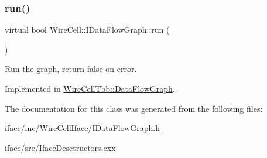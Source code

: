 \mbox{\label{class_wire_cell_1_1_i_data_flow_graph_ab741ef1a0f772cb278dd2f111b54867e}} 
\subsubsection{\texorpdfstring{run()}{run()}}
{\footnotesize\ttfamily virtual bool Wire\+Cell\+::\+I\+Data\+Flow\+Graph\+::run (\begin{DoxyParamCaption}{ }\end{DoxyParamCaption})\hspace{0.3cm}{\ttfamily [pure virtual]}}



Run the graph, return false on error. 



Implemented in \hyperlink{class_wire_cell_tbb_1_1_data_flow_graph_ae8e14d9ad578b85a9e6faf4db69cc31b}{Wire\+Cell\+Tbb\+::\+Data\+Flow\+Graph}.



The documentation for this class was generated from the following files\+:\begin{DoxyCompactItemize}
\item 
iface/inc/\+Wire\+Cell\+Iface/\hyperlink{_i_data_flow_graph_8h}{I\+Data\+Flow\+Graph.\+h}\item 
iface/src/\hyperlink{_iface_desctructors_8cxx}{Iface\+Desctructors.\+cxx}\end{DoxyCompactItemize}
